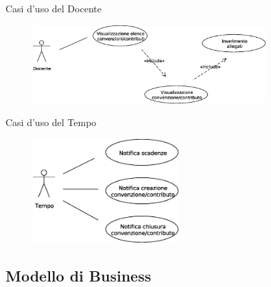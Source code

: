   \begin{frame}{Casi d'uso del Docente}
    \begin{figure}[h]
      \label{use_case_diag_teacher}
      \centering
      \includegraphics[width=0.8\textwidth]{images/casi_uso_docente.eps}
    \end{figure}
  \end{frame}
  
  \begin{frame}{Casi d'uso del Tempo}
    \begin{figure}[h]
      \label{use_case_diag_time}
      \centering
      \includegraphics[width = 0.5\textwidth]{images/casi_uso_tempo.eps}
    \end{figure}
  \end{frame}


  
  \subsection{Modello di Business}



